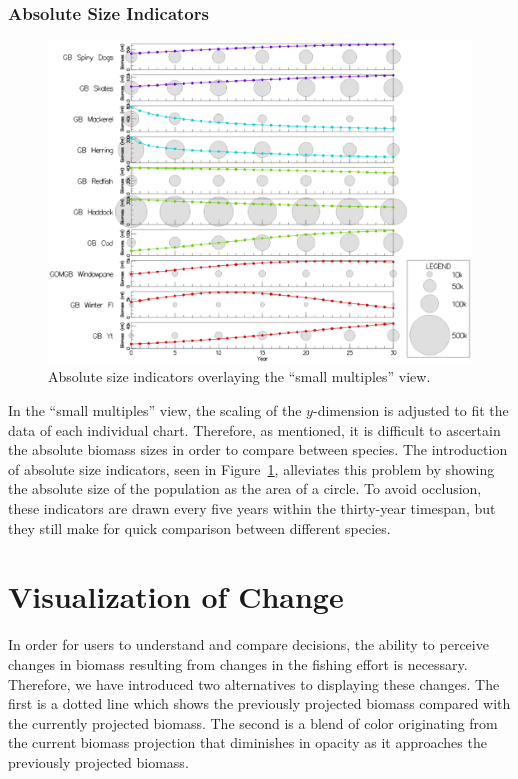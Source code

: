 \subsubsection{Absolute Size Indicators}

\begin{figure}[h]
	\centering
	\includegraphics[width=12cm]{figures/eps/msprod_abssize.eps}
	\caption{Absolute size indicators overlaying the ``small multiples'' view.}
	\label{fig:msprod_abssize}
\end{figure}

In the ``small multiples'' view, the scaling of the $y$-dimension is adjusted to fit the data of each individual chart.  Therefore, as mentioned, it is difficult to ascertain the absolute biomass sizes in order to compare between species.  The introduction of absolute size indicators, seen in Figure~\ref{fig:msprod_abssize}, alleviates this problem by showing the absolute size of the population as the area of a circle.  To avoid occlusion, these indicators are drawn every five years within the thirty-year timespan, but they still make for quick comparison between different species.

\section{Visualization of Change}

In order for users to understand and compare decisions, the ability to perceive changes in biomass resulting from changes in the fishing effort is necessary.  Therefore, we have introduced two alternatives to displaying these changes.  The first is a dotted line which shows the previously projected biomass compared with the currently projected biomass.  The second is a blend of color originating from the current biomass projection that diminishes in opacity as it approaches the previously projected biomass.

